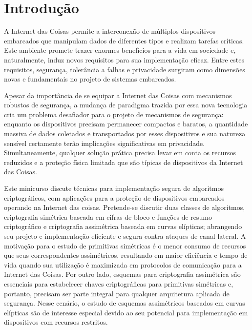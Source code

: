 \section{Introdução}

A Internet das Coisas permite a interconexão de múltiplos dispositivos embarcados que manipulam dados de diferentes tipos e realizam tarefas críticas. Este ambiente promete trazer enormes benefícios para a vida em sociedade e, naturalmente, induz novos requisitos para sua implementação eficaz. Entre estes requisitos, segurança, tolerância a falhas e privacidade surgiram como dimensões novas e fundamentais no projeto de sistemas embarcados.

Apesar da importância de se equipar a Internet das Coisas com mecanismos robustos de segurança, a mudança de paradigma trazida por essa nova tecnologia cria um problema desafiador para o projeto de mecanismos de segurança: enquanto os dispositivos precisam permanecer compactos e baratos, a quantidade massiva de dados coletados e transportados por esses dispositivos e sua natureza sensível certamente terão implicações significativas em privacidade. Simultaneamente, qualquer solução prática precisa levar em conta os recursos reduzidos e a proteção física limitada que são típicas de dispositivos da Internet das Coisas.

Este minicurso discute técnicas para implementação segura de algoritmos criptográficos, com aplicações para a proteção de dispositivos embarcados operando na Internet das coisas. Pretende-se discutir duas classes de algoritmos, criptografia simétrica baseada em cifras de bloco e funções de resumo criptográfico e criptografia assimétrica baseada em curvas elípticas; abrangendo seu projeto e implementação eficiente e segura contra ataques de canal lateral. A motivação para o estudo de primitivas simétricas é o menor consumo de recursos que seus correspondentes assimétricos, resultando em maior eficiência e tempo de vida quando sua utilização é maximizada em protocolos de comunicação para a Internet das Coisas. Por outro lado, esquemas para criptografia assimétrica são essenciais para estabelecer chaves criptográficas para primitivas simétricas e, portanto, precisam ser parte integral para qualquer arquitetura aplicada de segurança. Nesse cenário, o estudo de esquemas assimétricos baseados em curvas elípticas são de interesse especial devido ao seu potencial para implementação em dispositivos com recursos restritos.




